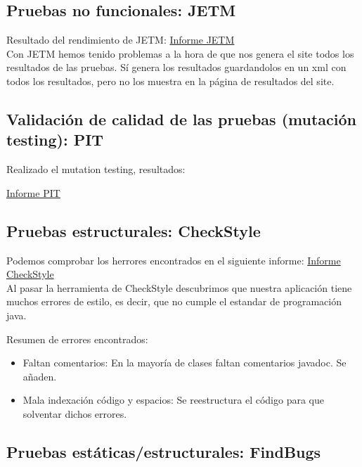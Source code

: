 \documentclass[DIV=calc,paper=a4,fontsize=11pt,onecolumn]{scrartcl} %
\begin{document}
	\subsection{Pruebas no funcionales: JETM}
	Resultado del rendimiento de JETM:
	\href{Informes/SiteTestInicial/jetm-timing-report.html}{Informe JETM} \\
	
	Con JETM hemos tenido problemas  a la hora de que nos genera el site todos los resultados de las pruebas. Sí genera los resultados guardandolos en un xml con todos los resultados, pero no los muestra en la página de resultados del site.
	\subsection{Validación de calidad de las pruebas (mutación testing): PIT}
	Realizado el mutation testing, resultados:
	
	\href{Informes/pit-reports/index.html}{Informe PIT} \\
	
	\subsection{Pruebas estructurales: CheckStyle}
	Podemos comprobar los herrores encontrados en el siguiente informe: \href{Informes/SiteTestInicial/checkstyle.html}{Informe CheckStyle} \\
	Al pasar la herramienta de CheckStyle descubrimos que nuestra aplicación tiene muchos errores de estilo, es decir, que no cumple el estandar de programación java.
	
	Resumen de errores encontrados:
	\begin{itemize}
		\item Faltan comentarios: En la mayoría de clases faltan comentarios javadoc. Se añaden.
		\item Mala indexación código y espacios: Se reestructura el código para que solventar dichos errores.
	\end{itemize}
	

	\subsection{Pruebas estáticas/estructurales: FindBugs}
	
\end{document}
